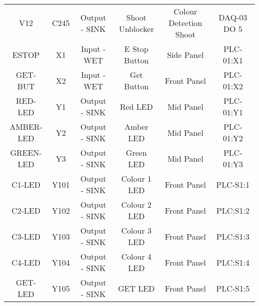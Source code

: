 \begin{center}
\begin{longtable}[c]{ |c|c|c|c|c|c| }
        V12	&	C245	&	Output - SINK	&	Shoot Unblocker	&	Colour Detection Shoot	& DAQ-03 DO 5\\
        ESTOP	&	X1	&	Input - WET	&	E Stop Button	&	Side Panel	&	PLC-01:X1\\
        GET-BUT	&	X2	&	Input - WET	&	Get Button	&	Front Panel	&	PLC-01:X2\\
        RED-LED	&	Y1	&	Output - SINK	&	Red LED	&	Mid Panel	&	PLC-01:Y1\\
        AMBER-LED	&	Y2	&	Output - SINK	&	Amber LED	&	Mid Panel	&	PLC-01:Y2\\
        GREEN-LED	&	Y3	&	Output - SINK	&	Green LED	&	Mid Panel	&	PLC-01:Y3\\
        C1-LED	&	Y101	&	Output - SINK	&	Colour 1 LED	&	Front Panel	&	PLC-S1:1\\
        C2-LED	&	Y102	&	Output - SINK	&	Colour 2 LED	&	Front Panel	&	PLC:S1:2\\
        C3-LED	&	Y103	&	Output - SINK	&	Colour 3 LED	&	Front Panel	&	PLC:S1:3\\
        C4-LED	&	Y104	&	Output - SINK	&	Colour 4 LED	&	Front Panel	&	PLC:S1:4\\
        GET-LED	&	Y105	&	Output - SINK	&	GET LED	&	Front Panel	&	PLC-S1:5\\
        \hline
    \end{longtable}
\end{center}
\label{table:ioList}